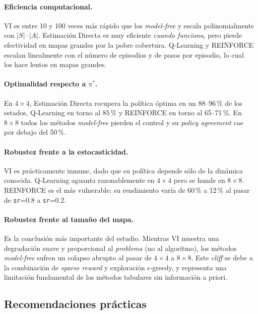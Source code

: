 \documentclass[11pt,a4paper]{article}
\begin{document}
\paragraph{Eficiencia computacional.} VI es entre 10 y 100 veces más rápido que los \emph{model-free} y escala polinomialmente con $|S|\cdot|A|$. Estimación Directa es muy eficiente \emph{cuando funciona}, pero pierde efectividad en mapas grandes por la pobre cobertura. Q-Learning y REINFORCE escalan linealmente con el número de episodios y de pasos por episodio, lo cual los hace lentos en mapas grandes.

\paragraph{Optimalidad respecto a $\pi^{\ast}$.} En $4\times 4$, Estimación Directa recupera la política óptima en un 88--96\,\% de los estados, Q-Learning en torno al 85\,\% y REINFORCE en torno al 65--71\,\%. En $8\times 8$ todos los métodos \emph{model-free} pierden el control y su \emph{policy agreement} cae por debajo del 50\,\%.

\paragraph{Robustez frente a la estocasticidad.} VI es prácticamente inmune, dado que su política depende sólo de la dinámica conocida. Q-Learning aguanta razonablemente en $4\times 4$ pero se hunde en $8\times 8$. REINFORCE es el más vulnerable: su rendimiento varía de 60\,\% a 12\,\% al pasar de \texttt{sr}=0.8 a \texttt{sr}=0.2.

\paragraph{Robustez frente al tamaño del mapa.} Es la conclusión más importante del estudio. Mientras VI muestra una degradación suave y proporcional al \emph{problema} (no al algoritmo), los métodos \emph{model-free} sufren un colapso abrupto al pasar de $4\times 4$ a $8\times 8$. Este \emph{cliff} se debe a la combinación de \emph{sparse reward} y exploración $\epsilon$-greedy, y representa una limitación fundamental de los métodos tabulares sin información a priori.

\subsection{Recomendaciones prácticas}
\end{document}
